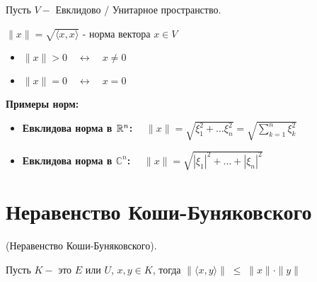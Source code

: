 \clearpage
Пусть $V -$ Евклидово / Унитарное пространство.

\begin{shdef}
    \begin{definition}
    \leavevmode \newline
   
    $\|x\| = \sqrt{\langle x, x \rangle}$ - норма вектора $x \in V$
        \begin{itemize}
            \item $\|x\| > 0 \quad \longleftrightarrow  \quad x \neq 0$
            \item  $\|x\| = 0 \quad \longleftrightarrow \quad x = 0$
        \end{itemize}
    \end{definition}
\end{shdef}

\vspace{1.0cm}
\textbf{Примеры норм:}
\begin{shex}
    \begin{itemize}
            \item \textbf{Евклидова норма в $\mathbb{R}^n$:} $\quad \|x\| = \sqrt{\xi_{1}^2 + \ldots \xi_{n}^2} = \sqrt{\sum_{k = 1}^{n} \xi_{k}^2}$
            \item \textbf{Евклидова норма в $\mathbb{C}^n$:} $\quad \|x\| = \sqrt{|\xi_{1}|^2 + \ldots + |\xi_{n}|^2}$
    \end{itemize}
\end{shex}



\clearpage
\section{Неравенство Коши-Буняковского}
\begin{shth}
\begin{theorem}
    (Неравенство Коши-Буняковского).
    \newline
    
    \vspace{0.3cm}
    Пусть $K -$ это $E$ или $U$, \quad $x,y \in K$, \quad тогда $\| \langle x,y \rangle\| \; \leq \; \|x\| \cdot \|y\|$
\end{theorem}
\end{shth}

